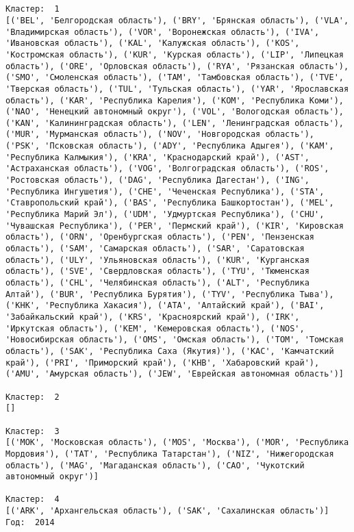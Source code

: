 \documentclass[11pt]{article}
\begin{document}
    \begin{center}
    \end{center}
    { \hspace*{\fill} \\}
    
    \begin{Verbatim}[commandchars=\\\{\}]

Кластер:  1
[('BEL', 'Белгородская область'), ('BRY', 'Брянская область'), ('VLA', 'Владимирская область'), ('VOR', 'Воронежская область'), ('IVA', 'Ивановская область'), ('KAL', 'Калужская область'), ('KOS', 'Костромская область'), ('KUR', 'Курская область'), ('LIP', 'Липецкая область'), ('ORE', 'Орловская область'), ('RYA', 'Рязанская область'), ('SMO', 'Смоленская область'), ('TAM', 'Тамбовская область'), ('TVE', 'Тверская область'), ('TUL', 'Тульская область'), ('YAR', 'Ярославская область'), ('KAR', 'Республика Карелия'), ('KOM', 'Республика Коми'), ('NAO', 'Ненецкий автономный округ'), ('VOL', 'Вологодская область'), ('KAN', 'Калинингpадская область'), ('LEN', 'Ленинградская область'), ('MUR', 'Мурманская область'), ('NOV', 'Новгородская область'), ('PSK', 'Псковская область'), ('ADY', 'Республика Адыгея'), ('KAM', 'Республика Калмыкия'), ('KRA', 'Краснодарский край'), ('AST', 'Астраханская область'), ('VOG', 'Волгоградская область'), ('ROS', 'Ростовская область'), ('DAG', 'Республика Дагестан'), ('ING', 'Республика Ингушетия'), ('CHE', 'Чеченская Республика'), ('STA', 'Ставропольский край'), ('BAS', 'Республика Башкортостан'), ('MEL', 'Республика Марий Эл'), ('UDM', 'Удмуртская Республика'), ('CHU', 'Чувашская Республика'), ('PER', 'Пермский край'), ('KIR', 'Кировская область'), ('ORN', 'Оренбургская область'), ('PEN', 'Пензенская область'), ('SAM', 'Самарская область'), ('SAR', 'Саратовская область'), ('ULY', 'Ульяновская область'), ('KUR', 'Курганская область'), ('SVE', 'Свердловская область'), ('TYU', 'Тюменская область'), ('CHL', 'Челябинская область'), ('ALT', 'Республика Алтай'), ('BUR', 'Республика Бурятия'), ('TYV', 'Республика Тыва'), ('KHK', 'Республика Хакасия'), ('ATA', 'Алтайский край'), ('BAI', 'Забайкальский край'), ('KRS', 'Красноярский край'), ('IRK', 'Иркутская область'), ('KEM', 'Кемеровская область'), ('NOS', 'Новосибирская область'), ('OMS', 'Омская область'), ('TOM', 'Томская область'), ('SAK', 'Республика Саха (Якутия)'), ('KAC', 'Камчатский край'), ('PRI', 'Приморский край'), ('KHB', 'Хабаровский край'), ('AMU', 'Амурская область'), ('JEW', 'Еврейская автономная область')]

Кластер:  2
[]

Кластер:  3
[('MOK', 'Московская область'), ('MOS', 'Москва'), ('MOR', 'Республика Мордовия'), ('TAT', 'Республика Татарстан'), ('NIZ', 'Нижегородская область'), ('MAG', 'Магаданская область'), ('CAO', 'Чукотский автономный округ')]

Кластер:  4
[('ARK', 'Архангельская область'), ('SAK', 'Сахалинская область')]
Год:  2014

    \end{Verbatim}
\end{document}
